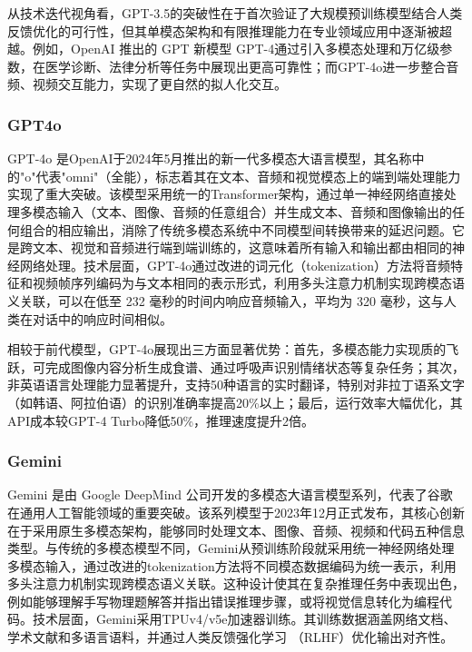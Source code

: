 从技术迭代视角看，GPT-3.5的突破性在于首次验证了大规模预训练模型结合人类反馈优化的可行性，但其单模态架构和有限推理能力在专业领域应用中逐渐被超越。例如，OpenAI 推出的 GPT 新模型 GPT-4通过引入多模态处理和万亿级参数，在医学诊断、法律分析等任务中展现出更高可靠性；而GPT-4o进一步整合音频、视频交互能力，实现了更自然的拟人化交互。

\subsubsection{GPT4o}
\label{sec:TOSWT-gen-gpt4o}

GPT-4o \cite{gpt4o} 是OpenAI于2024年5月推出的新一代多模态大语言模型，其名称中的"o"代表"omni"（全能），标志着其在文本、音频和视觉模态上的端到端处理能力实现了重大突破。该模型采用统一的Transformer架构，通过单一神经网络直接处理多模态输入（文本、图像、音频的任意组合）并生成文本、音频和图像输出的任何组合的相应输出，消除了传统多模态系统中不同模型间转换带来的延迟问题。它是跨文本、视觉和音频进行端到端训练的，这意味着所有输入和输出都由相同的神经网络处理。技术层面，GPT-4o通过改进的词元化（tokenization）方法将音频特征和视频帧序列编码为与文本相同的表示形式，利用多头注意力机制实现跨模态语义关联，可以在低至 232 毫秒的时间内响应音频输入，平均为 320 毫秒，这与人类在对话中的响应时间相似。

相较于前代模型，GPT-4o展现出三方面显著优势：首先，多模态能力实现质的飞跃，可完成图像内容分析生成食谱、通过呼吸声识别情绪状态等复杂任务；其次，非英语语言处理能力显著提升，支持50种语言的实时翻译，特别对非拉丁语系文字（如韩语、阿拉伯语）的识别准确率提高20\%以上；最后，运行效率大幅优化，其API成本较GPT-4 Turbo降低50\%，推理速度提升2倍。

\subsubsection{Gemini}
\label{sec:TOSWT-gen-gemini}

Gemini \cite{geminiteam2024geminifamilyhighlycapable} 是由 Google DeepMind 公司开发的多模态大语言模型系列，代表了谷歌在通用人工智能领域的重要突破。该系列模型于2023年12月正式发布，其核心创新在于采用原生多模态架构，能够同时处理文本、图像、音频、视频和代码五种信息类型。与传统的多模态模型不同，Gemini从预训练阶段就采用统一神经网络处理多模态输入，通过改进的tokenization方法将不同模态数据编码为统一表示，利用多头注意力机制实现跨模态语义关联。这种设计使其在复杂推理任务中表现出色，例如能够理解手写物理题解答并指出错误推理步骤，或将视觉信息转化为编程代码。技术层面，Gemini采用TPUv4/v5e加速器训练。其训练数据涵盖网络文档、学术文献和多语言语料，并通过人类反馈强化学习 \cite{kaufmann2024surveyreinforcementlearninghuman} （RLHF）优化输出对齐性。

